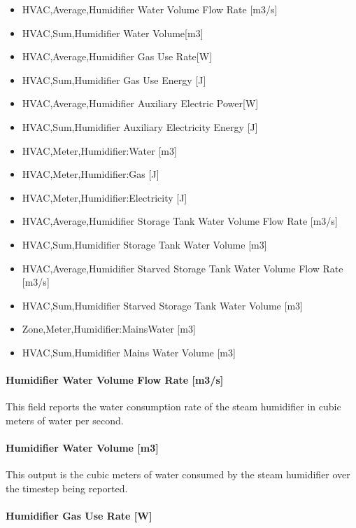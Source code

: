 \begin{itemize}
\tightlist
\item
  HVAC,Average,Humidifier Water Volume Flow Rate {[}m3/s{]}
\item
  HVAC,Sum,Humidifier Water Volume{[}m3{]}
\item
  HVAC,Average,Humidifier Gas Use Rate{[}W{]}
\item
  HVAC,Sum,Humidifier Gas Use Energy {[}J{]}
\item
  HVAC,Average,Humidifier Auxiliary Electric Power{[}W{]}
\item
  HVAC,Sum,Humidifier Auxiliary Electricity Energy {[}J{]}
\item
  HVAC,Meter,Humidifier:Water {[}m3{]}
\item
  HVAC,Meter,Humidifier:Gas {[}J{]}
\item
  HVAC,Meter,Humidifier:Electricity {[}J{]}
\item
  HVAC,Average,Humidifier Storage Tank Water Volume Flow Rate {[}m3/s{]}
\item
  HVAC,Sum,Humidifier Storage Tank Water Volume {[}m3{]}
\item
  HVAC,Average,Humidifier Starved Storage Tank Water Volume Flow Rate {[}m3/s{]}
\item
  HVAC,Sum,Humidifier Starved Storage Tank Water Volume {[}m3{]}
\item
  Zone,Meter,Humidifier:MainsWater {[}m3{]}
\item
  HVAC,Sum,Humidifier Mains Water Volume {[}m3{]}
\end{itemize}

\paragraph{Humidifier Water Volume Flow Rate {[}m3/s{]}}\label{humidifier-water-volume-flow-rate-m3s-1}

This field reports the water consumption rate of the steam humidifier in cubic meters of water per second.

\paragraph{Humidifier Water Volume {[}m3{]}}\label{humidifier-water-volume-m3}

This output is the cubic meters of water consumed by the steam humidifier over the timestep being reported.

\paragraph{Humidifier Gas Use Rate {[}W{]}}\label{humidifier-gas-use-rate-w}

